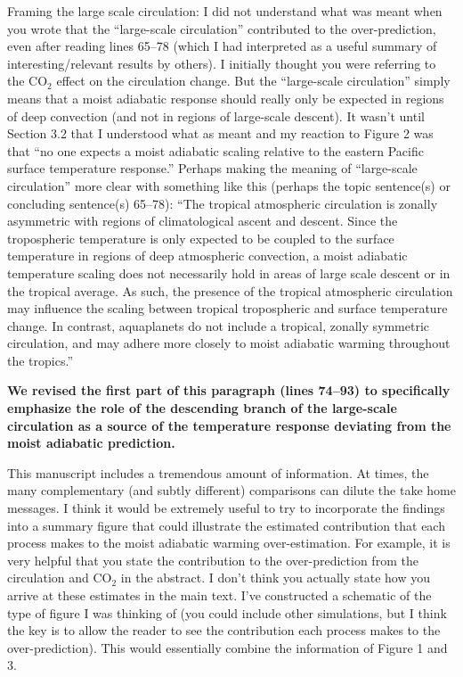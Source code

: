 \documentclass[11pt]{article}
\begin{document}
Framing the large scale circulation: I did not understand what was meant when you wrote that the ``large-scale circulation'' contributed to the over-prediction, even after reading lines 65--78 (which I had interpreted as a useful summary of interesting/relevant results by others). I initially thought you were referring to the CO\(_2\) effect on the circulation change. But the ``large-scale circulation'' simply means that a moist adiabatic response should really only be expected in regions of deep convection (and not in regions of large-scale descent). It wasn't until Section 3.2 that I understood what as meant and my reaction to Figure 2 was that ``no one expects a moist adiabatic scaling relative to the eastern Pacific surface temperature response.'' Perhaps making the meaning of ``large-scale circulation'' more clear with something like this (perhaps the topic sentence(s) or concluding sentence(s) 65--78): ``The tropical atmospheric circulation is zonally asymmetric with regions of climatological ascent and descent. Since the tropospheric temperature is only expected to be coupled to the surface temperature in regions of deep atmospheric convection, a moist adiabatic temperature scaling does not necessarily hold in areas of large scale descent or in the tropical average. As such, the presence of the tropical atmospheric circulation may influence the scaling between tropical tropospheric and surface temperature change. In contrast, aquaplanets do not include a tropical, zonally symmetric circulation, and may adhere more closely to moist adiabatic warming throughout the tropics.''

\textbf{We revised the first part of this paragraph (lines 74--93) to specifically emphasize the role of the descending branch of the large-scale circulation as a source of the temperature response deviating from the moist adiabatic prediction.}

This manuscript includes a tremendous amount of information. At times, the many complementary (and subtly different) comparisons can dilute the take home messages. I think it would be extremely useful to try to incorporate the findings into a summary figure that could illustrate the estimated contribution that each process makes to the moist adiabatic warming over-estimation. For example, it is very helpful that you state the contribution to the over-prediction from the circulation and CO\(_2\) in the abstract. I don't think you actually state how you arrive at these estimates in the main text. I've constructed a schematic of the type of figure I was thinking of (you could include other simulations, but I think the key is to allow the reader to see the contribution each process makes to the over-prediction). This would essentially combine the information of Figure 1 and 3.
\end{document}
